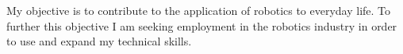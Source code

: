 

\begin{cvparagraph}

My objective is to contribute to the application of robotics to everyday life. To further this objective I am seeking employment in the robotics industry in order to use and expand my technical skills.

\end{cvparagraph}

